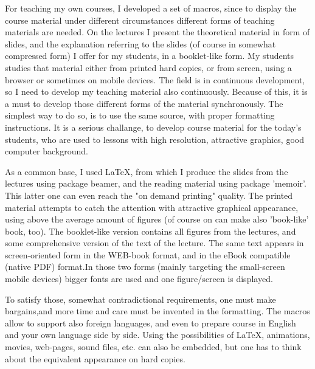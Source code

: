 \MEDtext
{
For teaching my own courses, I developed a set of macros, since to display  the course material
under different circumstances different forms of teaching materials are needed. On the lectures
I present the theoretical material in form of slides, and the explanation referring to the slides
(of course in somewhat compressed form) I offer for my students, in a booklet-like form. My students
studies that material either from printed hard copies, or from screen, using a browser or sometimes
on mobile devices. The field is in continuous development, so I need to develop my teaching material
also continuously. Because of this, it is a must to develop those different forms of the material
synchronously. The simplest way to do so, is to use the same source, with proper formatting instructions.
It is a serious challange, to develop course material for the today's students, who are used to
lessons with high resolution, attractive graphics, good computer background.

As a common base, I used LaTeX, from which I produce the slides from the lectures using package beamer,
and the reading material using package 'memoir'. This latter one can even reach the "on demand printing"
quality. The printed material attempts to catch the attention with attractive graphical appearance,
using above the average amount of figures (of course on can make also 'book-like' book, too). The
booklet-like version contains all figures from the lectures, and some comprehensive version of
the text of the lecture. The same text appears in screen-oriented form in the WEB-book format, and
in the eBook compatible (native PDF) format.In those two forms (mainly targeting the small-screen
mobile devices) bigger fonts are used and one figure/screen is displayed.

To satisfy those, somewhat contradictional  requirements, one must make bargains,and more time and care
must be invented in the formatting. The macros allow to support also foreign languages, and even
to prepare course in English and your own language side by side. Using the possibilities of LaTeX,
animations, movies, web-pages, sound files, etc. can also be embedded, but one has to think about
the equivalent appearance on hard copies.
}
